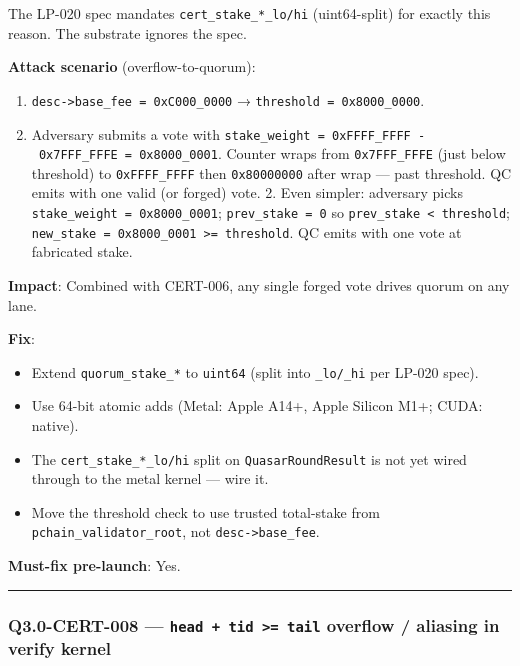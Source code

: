 \documentclass[
]{article}
\providecommand{\tightlist}{%
  \setlength{\itemsep}{0pt}\setlength{\parskip}{0pt}}
\begin{document}
The LP-020 spec mandates \texttt{cert\_stake\_*\_lo/hi} (uint64-split)
for exactly this reason. The substrate ignores the spec.

\textbf{Attack scenario} (overflow-to-quorum):

\begin{enumerate}
\def\labelenumi{\arabic{enumi}.}
\tightlist
\item
  \texttt{desc-\textgreater{}base\_fee\ =\ 0xC000\_0000} →
  \texttt{threshold\ =\ 0x8000\_0000}.
\item
  Adversary submits a vote with
  \texttt{stake\_weight\ =\ 0xFFFF\_FFFF\ -\ 0x7FFF\_FFFE\ =\ 0x8000\_0001}.
  Counter wraps from \texttt{0x7FFF\_FFFE} (just below threshold) to
  \texttt{0xFFFF\_FFFF} then \texttt{0x80000000} after wrap --- past
  threshold. QC emits with one valid (or forged) vote.
  2\textquotesingle. Even simpler: adversary picks
  \texttt{stake\_weight\ =\ 0x8000\_0001}; \texttt{prev\_stake\ =\ 0} so
  \texttt{prev\_stake\ \textless{}\ threshold};
  \texttt{new\_stake\ =\ 0x8000\_0001\ \textgreater{}=\ threshold}. QC
  emits with one vote at fabricated stake.
\end{enumerate}

\textbf{Impact}: Combined with CERT-006, any single forged vote drives
quorum on any lane.

\textbf{Fix}:

\begin{itemize}
\tightlist
\item
  Extend \texttt{quorum\_stake\_*} to \texttt{uint64} (split into
  \texttt{\_lo/\_hi} per LP-020 spec).
\item
  Use 64-bit atomic adds (Metal: Apple A14+, Apple Silicon M1+; CUDA:
  native).
\item
  The \texttt{cert\_stake\_*\_lo/hi} split on \texttt{QuasarRoundResult}
  is not yet wired through to the metal kernel --- wire it.
\item
  Move the threshold check to use trusted total-stake from
  \texttt{pchain\_validator\_root}, not
  \texttt{desc-\textgreater{}base\_fee}.
\end{itemize}

\textbf{Must-fix pre-launch}: Yes.

\begin{center}\rule{0.5\linewidth}{0.5pt}\end{center}

\subsubsection{\texorpdfstring{Q3.0-CERT-008 ---
\texttt{head\ +\ tid\ \textgreater{}=\ tail} overflow / aliasing in
verify
kernel}{Q3.0-CERT-008 --- head + tid \textgreater= tail overflow / aliasing in verify kernel}}\label{q30-cert-008--head--tid--tail-overflow--aliasing-in-verify-kernel}
\end{document}
